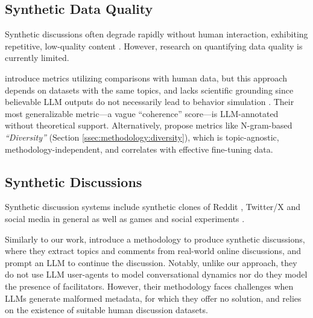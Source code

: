 \subsection{Synthetic Data Quality}
\label{ssec:related:quality}

Synthetic discussions often degrade rapidly without human interaction, exhibiting repetitive, low-quality content \citep{ulmer2024}. 
However, research on quantifying data quality is currently limited.

\citet{balog_2024} introduce metrics utilizing comparisons with human data, but this approach depends on datasets with the same topics, and lacks scientific grounding since believable \ac{LLM} outputs do not necessarily lead to behavior simulation \cite{rossi_2024}. Their most generalizable metric—a vague “coherence” score—is \ac{LLM}-annotated without theoretical support. Alternatively, \citet{ulmer2024} propose metrics like N-gram-based \textit{“Diversity”} (Section \ref{ssec:methodology:diversity}), which is topic-agnostic, methodology-independent, and correlates with effective fine-tuning data.


\subsection{Synthetic Discussions}
\label{ssec:related:discussions}


Synthetic discussion systems 
include synthetic clones of Reddit \cite{park_simulacra}, Twitter/X \cite{mou_2024} and social media in general \cite{tornberg_2023, y_social} as well as games \cite{Park2023GenerativeAI} and social experiments \cite{zhou_2024_sotopia}.

Similarly to our work, \citet{balog_2024} introduce a methodology to produce synthetic discussions, where they extract topics and comments from real-world online discussions, and prompt an \ac{LLM} to continue the discussion. Notably, unlike our approach, they do not use \ac{LLM} user-agents to model conversational dynamics nor do they model the presence of facilitators. However, their methodology faces challenges when \acp{LLM} generate malformed metadata, for which they offer no solution, and relies on the existence of suitable human discussion datasets.

